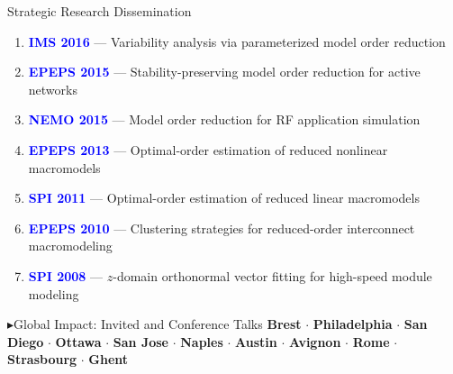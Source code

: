 \begin{frame}[t, allowframebreaks]{Strategic Research Dissemination}
\begin{enumerate}
		\item \textbf{\textcolor{blue}{IMS 2016}} — Variability analysis via parameterized model order reduction
		\item \textbf{\textcolor{blue}{EPEPS 2015}} — Stability-preserving model order reduction for active networks
		\item \textbf{\textcolor{blue}{NEMO 2015}} — Model order reduction for RF application simulation
		\item \textbf{\textcolor{blue}{EPEPS 2013}} — Optimal-order estimation of reduced nonlinear macromodels
		\item \textbf{\textcolor{blue}{SPI 2011}} — Optimal-order estimation of reduced linear macromodels
		\item \textbf{\textcolor{blue}{EPEPS 2010}} — Clustering strategies for reduced-order interconnect macromodeling
		\item \textbf{\textcolor{blue}{SPI 2008}} — $z$-domain orthonormal vector fitting for high-speed module modeling
	\end{enumerate}

	\vfill

	\begin{exampleblock}%
		{\textcolor{green!70!black}{$\blacktriangleright$}Global Impact: Invited and Conference Talks}\medskip
		\centering
		\footnotesize
		\textbf{Brest} $\cdot$ \textbf{Philadelphia} $\cdot$ \textbf{San Diego} $\cdot$ \textbf{Ottawa} $\cdot$
		\textbf{San Jose} $\cdot$ \textbf{Naples} $\cdot$ \textbf{Austin} $\cdot$
		\textbf{Avignon} $\cdot$ \textbf{Rome} $\cdot$ \textbf{Strasbourg} $\cdot$ \textbf{Ghent}
	\end{exampleblock}
	\vfill
\end{frame}

